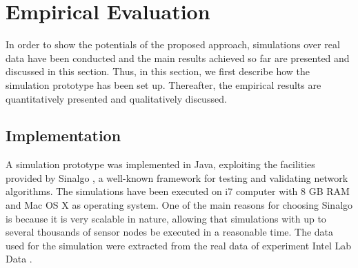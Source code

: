 \documentclass{acm_proc_article-sp}
\begin{document}



\section{Empirical Evaluation}
\label{eval}

In order to show the potentials of the proposed approach, simulations over real
data have been conducted and the main results achieved so far are presented and
discussed in this section. Thus, in this section, we first describe how the
simulation prototype has been set up. Thereafter, the empirical results are
quantitatively presented and qualitatively discussed.

\subsection{Implementation}
\label{implementation}

A simulation prototype was implemented in Java, exploiting the facilities
provided by Sinalgo \cite{Sinalgo2007}, a well-known framework for testing and
validating network algorithms. The simulations have been executed on i7 computer
with 8 GB RAM and Mac OS X as operating system.
One of the main reasons for choosing Sinalgo is because it is very scalable in
nature, allowing that simulations with up to several thousands of sensor nodes
be executed in a reasonable time. The data used for the simulation were
extracted from the real data of experiment Intel Lab Data \cite{Intel2004}. 
\end{document}
